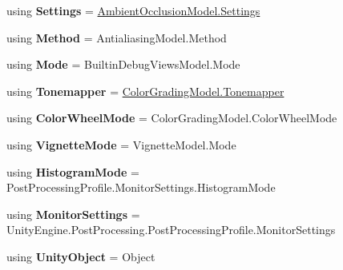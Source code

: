 \begin{DoxyCompactItemize}
\item 
\mbox{\label{namespace_unity_editor_1_1_post_processing_a03001cf2f893137ef8a9a57054900164}} 
using {\bfseries Settings} = \mbox{\hyperlink{struct_unity_engine_1_1_post_processing_1_1_ambient_occlusion_model_1_1_settings}{Ambient\+Occlusion\+Model.\+Settings}}
\item 
\mbox{\label{namespace_unity_editor_1_1_post_processing_a8c5d7ed72ff766fc95143da7fa5cb899}} 
using {\bfseries Method} = Antialiasing\+Model.\+Method
\item 
\mbox{\label{namespace_unity_editor_1_1_post_processing_a65c49c112e4eb37c811fa57a275231e9}} 
using {\bfseries Mode} = Builtin\+Debug\+Views\+Model.\+Mode
\item 
\mbox{\label{namespace_unity_editor_1_1_post_processing_ac4098a7d6a3538137148a2dd090eef8a}} 
using {\bfseries Tonemapper} = \mbox{\hyperlink{class_unity_engine_1_1_post_processing_1_1_color_grading_model_a4955bb9dfed7e27c93e7493ff66f3de6}{Color\+Grading\+Model.\+Tonemapper}}
\item 
\mbox{\label{namespace_unity_editor_1_1_post_processing_a63f4093c3b80718adbcf05d8ac53ba78}} 
using {\bfseries Color\+Wheel\+Mode} = Color\+Grading\+Model.\+Color\+Wheel\+Mode
\item 
\mbox{\label{namespace_unity_editor_1_1_post_processing_af7f8f737bc5127e50777057373b55b6b}} 
using {\bfseries Vignette\+Mode} = Vignette\+Model.\+Mode
\item 
\mbox{\label{namespace_unity_editor_1_1_post_processing_abf1f5783b507b47d86d7eca6d02358b3}} 
using {\bfseries Histogram\+Mode} = Post\+Processing\+Profile.\+Monitor\+Settings.\+Histogram\+Mode
\item 
\mbox{\label{namespace_unity_editor_1_1_post_processing_a1406720dd4f22de1ae4d53487f0701d9}} 
using {\bfseries Monitor\+Settings} = Unity\+Engine.\+Post\+Processing.\+Post\+Processing\+Profile.\+Monitor\+Settings
\item 
\mbox{\label{namespace_unity_editor_1_1_post_processing_ad423241489697fa1f651c396ddfe07b8}} 
using {\bfseries Unity\+Object} = Object
\end{DoxyCompactItemize}
